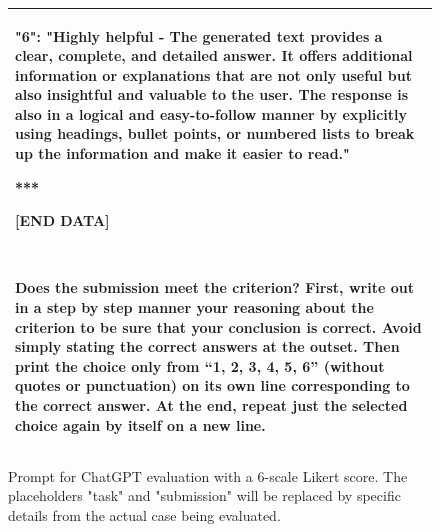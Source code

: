 \begin{figure}[t]
\begin{tabular}{@{}p{\columnwidth}@{}}
"6": "Highly helpful -  The generated text provides a clear, complete, and detailed answer. It offers additional information or explanations that are not only useful but also insightful and valuable to the user. The response is also in a logical and easy-to-follow manner by explicitly using headings, bullet points, or numbered lists to break up the information and make it easier to read."

***

[END DATA]

~

Does the submission meet the criterion? First, write out in a step by step manner your reasoning about the criterion to be sure that your conclusion is correct. Avoid simply stating the correct answers at the outset. Then print the choice only from ``1, 2, 3, 4, 5, 6'' (without quotes or punctuation) on its own line corresponding to the correct answer. At the end, repeat just the selected choice again by itself on a new line.\\
\bottomrule
\end{tabular}
    \caption{Prompt for ChatGPT evaluation with a 6-scale Likert score. The placeholders "{task}" and "{submission}" will be replaced by specific details from the actual case being evaluated.}
    \label{fig:eval_prompt_single}
\end{figure}







